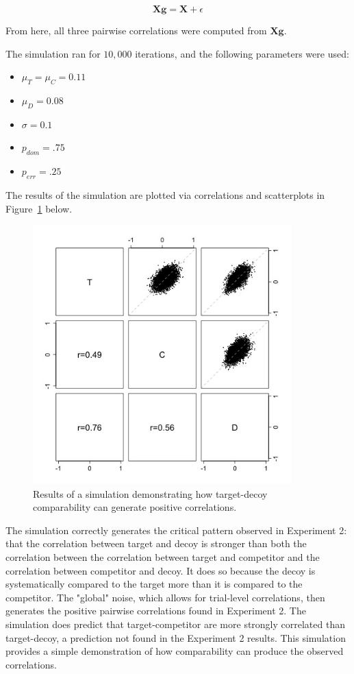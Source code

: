 \begin{equation}
   \bm{Xg} = \bm{X}+\epsilon
\end{equation}

From here, all three pairwise correlations were computed from $\bm{Xg}$. 

The simulation ran for $10,000$ iterations, and the following parameters were used:

\begin{itemize}
    \item $\mu_{T}=\mu_{C}=0.11$
    \item $\mu_{D}=0.08$
    \item $\sigma=0.1$
    \item $p_{dom}=.75$
    \item $p_{err}=.25$
\end{itemize}

The results of the simulation are plotted via correlations and scatterplots in Figure~\ref{fig:corr_sim} below.

\begin{figure}
   \centering
   \includegraphics[width=100mm]{figures/creating_correlations_sim.jpeg}
   \caption{Results of a simulation demonstrating how target-decoy comparability can generate positive correlations.}
   \label{fig:corr_sim}
\end{figure}

The simulation correctly generates the critical pattern observed in Experiment 2: that the correlation between target and decoy is stronger than both the correlation between the correlation between target and competitor and the correlation between competitor and decoy. It does so because the decoy is systematically compared to the target more than it is compared to the competitor. The "global" noise, which allows for trial-level correlations, then generates the positive pairwise correlations found in Experiment 2. The simulation does predict that target-competitor are more strongly correlated than target-decoy, a prediction not found in the Experiment 2 results. This simulation provides a simple demonstration of how comparability can produce the observed correlations.

